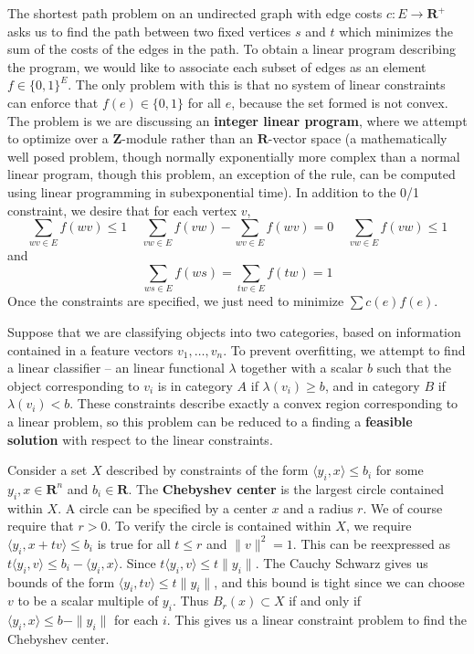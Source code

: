     \begin{example}
        The shortest path problem on an undirected graph with edge costs $c: E \to \mathbf{R}^+$ asks us to find the path between two fixed vertices $s$ and $t$ which minimizes the sum of the costs of the edges in the path. To obtain a linear program describing the program, we would like to associate each subset of edges as an element $f \in \{ 0, 1 \}^E$. The only problem with this is that no system of linear constraints can enforce that $f(e) \in \{ 0, 1 \}$ for all $e$, because the set formed is not convex. The problem is we are discussing an {\bf integer linear program}, where we attempt to optimize over a $\mathbf{Z}$-module rather than an $\mathbf{R}$-vector space (a mathematically well posed problem, though normally exponentially more complex than a normal linear program, though this problem, an exception of the rule, can be computed using linear programming in subexponential time). In addition to the 0/1 constraint, we desire that for each vertex $v$,
        \[ \sum_{wv \in E} f(wv) \leq 1 \ \ \ \ \ \sum_{vw \in E} f(vw) - \sum_{wv \in E} f(wv) = 0\ \ \ \ \ \sum_{vw \in E} f(vw) \leq 1 \]
        and
        \[ \sum_{ws \in E} f(ws) = \sum_{tw \in E} f(tw) = 1 \]
        Once the constraints are specified, we just need to minimize $\sum c(e) f(e)$.
    \end{example}

    \begin{example}
        Suppose that we are classifying objects into two categories, based on information contained in a feature vectors $v_1, \dots, v_n$. To prevent overfitting, we attempt to find a linear classifier -- an linear functional $\lambda$ together with a scalar $b$ such that the object corresponding to $v_i$ is in category $A$ if $\lambda(v_i) \geq b$, and in category $B$ if $\lambda(v_i) < b$. These constraints describe exactly a convex region corresponding to a linear problem, so this problem can be reduced to a finding a {\bf feasible solution} with respect to the linear constraints.
    \end{example}

    \begin{example}
        Consider a set $X$ described by constraints of the form $\langle y_i, x \rangle \leq b_i$ for some $y_i, x \in \mathbf{R}^n$ and $b_i \in \mathbf{R}$. The {\bf Chebyshev center} is the largest circle contained within $X$. A circle can be specified by a center $x$ and a radius $r$. We of course require that $r > 0$. To verify the circle is contained within $X$, we require $\langle y_i, x + tv \rangle \leq b_i$ is true for all $t \leq r$ and $\| v \|^2 = 1$. This can be reexpressed as $t \langle y_i, v \rangle \leq b_i - \langle y_i, x \rangle$. Since $t \langle y_i, v \rangle \leq t \| y_i \|$. The Cauchy Schwarz gives us bounds of the form $\langle y_i, t v \rangle \leq t \| y_i \|$, and this bound is tight since we can choose $v$ to be a scalar multiple of $y_i$. Thus $B_r(x) \subset X$ if and only if $\langle y_i, x \rangle \leq b - \| y_i \|$ for each $i$. This gives us a linear constraint problem to find the Chebyshev center.
    \end{example}

